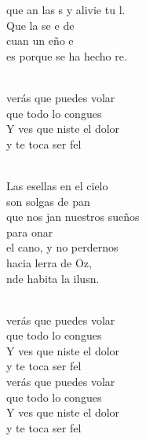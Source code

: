 \documentclass[12pt]{article}
\begin{document}
\begin{multicols*}{2}
\begin{cancion}
	que an las s y alivie tu l.\\
	Que la  se e de \\
	cuan un eño e\\
	es porque se ha hecho re.\\\jump\\
	\begin{chorus}%
	verás que puedes volar\\
	que todo lo congues\\
	Y ves que niste el dolor \\
	y te toca ser fel\\
	\end{chorus}%
	\jump\\
	Las esellas en el cielo\\
	son solgas de pan\\
	que nos jan nuestros sueños\\
	para onar\\
	el cano, y no perdernos\\
	hacia lerra de Oz,\\
	nde habita la ilusn. \\\jump\\
	\begin{chorus}%
	verás que puedes volar\\
	que todo lo congues\\
	Y ves que niste el dolor \\
	y te toca ser fel\\
	verás que puedes volar\\
	que todo lo congues\\
	Y ves que niste el dolor \\
	y te toca ser fel\\
	\end{chorus}%
	\jump\\
\end{cancion}%


\end{multicols*}
\end{document}
